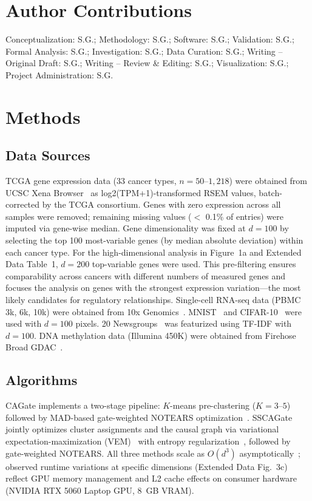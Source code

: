 \documentclass[12pt,a4paper]{article}
\begin{document}
\section*{Author Contributions}
Conceptualization: S.G.; Methodology: S.G.; Software: S.G.; Validation: S.G.; Formal Analysis: S.G.; Investigation: S.G.; Data Curation: S.G.; Writing -- Original Draft: S.G.; Writing -- Review \& Editing: S.G.; Visualization: S.G.; Project Administration: S.G.

\section{Methods}

\subsection{Data Sources}
TCGA gene expression data (33 cancer types, $n = 50$--$1{,}218$) were obtained from UCSC Xena Browser~\cite{weinstein2013cancer} as log2(TPM+1)-transformed RSEM values, batch-corrected by the TCGA consortium. Genes with zero expression across all samples were removed; remaining missing values ($<$ 0.1\% of entries) were imputed via gene-wise median. Gene dimensionality was fixed at $d = 100$ by selecting the top 100 most-variable genes (by median absolute deviation) within each cancer type. For the high-dimensional analysis in Figure~1a and Extended Data Table~1, $d = 200$ top-variable genes were used. This pre-filtering ensures comparability across cancers with different numbers of measured genes and focuses the analysis on genes with the strongest expression variation---the most likely candidates for regulatory relationships. Single-cell RNA-seq data (PBMC 3k, 6k, 10k) were obtained from 10x Genomics~\cite{zheng2017massively}. MNIST~\cite{lecun1998mnist} and CIFAR-10~\cite{krizhevsky2009cifar} were used with $d = 100$ pixels. 20 Newsgroups~\cite{lang1995newsweeder} was featurized using TF-IDF with $d = 100$. DNA methylation data (Illumina 450K) were obtained from Firehose Broad GDAC~\cite{bibikova2011high}.

\subsection{Algorithms}
CAGate implements a two-stage pipeline: $K$-means pre-clustering ($K = 3$--$5$) followed by MAD-based gate-weighted NOTEARS optimization~\cite{macqueen1967classification, arthur2007kmeans}. SSCAGate jointly optimizes cluster assignments and the causal graph via variational expectation-maximization (VEM)~\cite{dempster1977em} with entropy regularization~\cite{blei2003lda}, followed by gate-weighted NOTEARS. All three methods scale as $O(d^3)$ asymptotically~\cite{zheng2018dags}; observed runtime variations at specific dimensions (Extended Data Fig.~3c) reflect GPU memory management and L2 cache effects on consumer hardware (NVIDIA RTX 5060 Laptop GPU, 8~GB VRAM).
\end{document}
